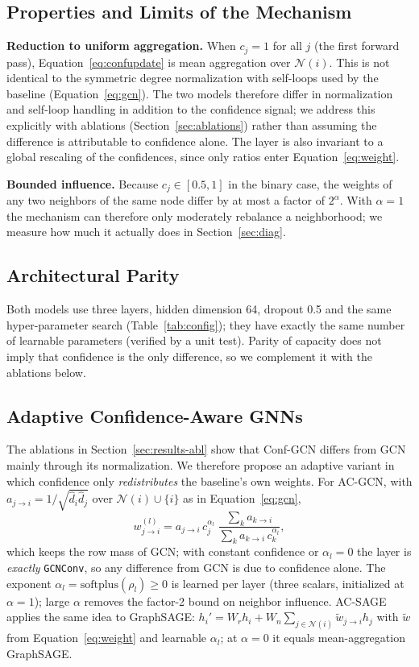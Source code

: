 \documentclass{csimq}
\begin{document}
\subsection{Properties and Limits of the Mechanism}
\label{sec:props}
\textbf{Reduction to uniform aggregation.} When $c_j=1$ for all $j$ (the first forward pass), Equation~\eqref{eq:confupdate} is mean aggregation over $\mathcal{N}(i)$. This is not identical to the symmetric degree normalization with self-loops used by the baseline (Equation~\ref{eq:gcn}). The two models therefore differ in normalization and self-loop handling in addition to the confidence signal; we address this explicitly with ablations (Section~\ref{sec:ablations}) rather than assuming the difference is attributable to confidence alone. The layer is also invariant to a global rescaling of the confidences, since only ratios enter Equation~\eqref{eq:weight}.

\textbf{Bounded influence.} Because $c_j\in[0.5,1]$ in the binary case, the weights of any two neighbors of the same node differ by at most a factor of $2^{\alpha}$. With $\alpha=1$ the mechanism can therefore only moderately rebalance a neighborhood; we measure how much it actually does in Section~\ref{sec:diag}.

\subsection{Architectural Parity}
Both models use three layers, hidden dimension 64, dropout 0.5 and the same hyper-parameter search (Table~\ref{tab:config}); they have exactly the same number of learnable parameters (verified by a unit test). Parity of capacity does not imply that confidence is the only difference, so we complement it with the ablations below.

\subsection{Adaptive Confidence-Aware GNNs}
\label{sec:adaptive}
The ablations in Section~\ref{sec:results-abl} show that Conf-GCN differs from GCN mainly through its normalization. We therefore propose an adaptive variant in which confidence only \emph{redistributes} the baseline's own weights. For AC-GCN, with $a_{j\rightarrow i}=1/\sqrt{\hat d_i\hat d_j}$ over $\mathcal{N}(i)\cup\{i\}$ as in Equation~\eqref{eq:gcn},
\begin{equation}
w^{(l)}_{j\rightarrow i}=a_{j\rightarrow i}\,c_j^{\alpha_l}\;\frac{\sum_{k}a_{k\rightarrow i}}{\sum_{k}a_{k\rightarrow i}\,c_k^{\alpha_l}},
\label{eq:acgcn}
\end{equation}
which keeps the row mass of GCN; with constant confidence or $\alpha_l=0$ the layer is \emph{exactly} \texttt{GCNConv}, so any difference from GCN is due to confidence alone. The exponent $\alpha_l=\mathrm{softplus}(\rho_l)\ge0$ is learned per layer (three scalars, initialized at $\alpha=1$); large $\alpha$ removes the factor-2 bound on neighbor influence. AC-SAGE applies the same idea to GraphSAGE: $h_i'=W_r h_i+W_n\sum_{j\in\mathcal{N}(i)}\tilde w_{j\rightarrow i}h_j$ with $\tilde w$ from Equation~\eqref{eq:weight} and learnable $\alpha_l$; at $\alpha=0$ it equals mean-aggregation GraphSAGE.
\end{document}
